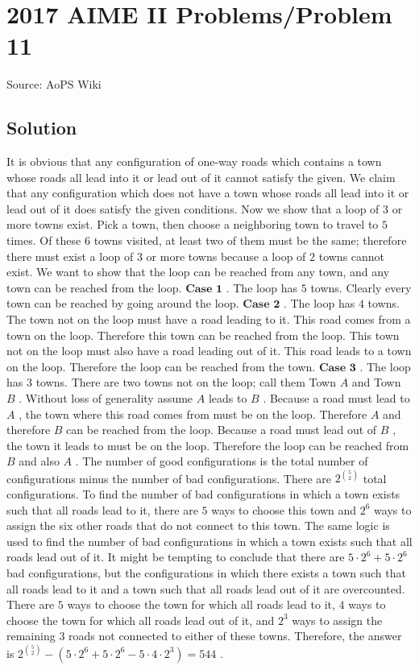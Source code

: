 \documentclass[12pt]{article}
\begin{document}
\section*{{2017 AIME II Problems/Problem 11}}
Source: AoPS Wiki

\subsection*{Solution}
It is obvious that any configuration of one-way roads which contains a town whose roads all lead into it or lead out of it cannot satisfy the given. We claim that any configuration which does not have a town whose roads all lead into it or lead out of it does satisfy the given conditions. Now we show that a loop of $3$ or more towns exist. Pick a town, then choose a neighboring town to travel to $5$ times. Of these $6$ towns visited, at least two of them must be the same; therefore there must exist a loop of $3$ or more towns because a loop of $2$ towns cannot exist. We want to show that the loop can be reached from any town, and any town can be reached from the loop. $\textbf{Case 1}$ . The loop has $5$ towns.
Clearly every town can be reached by going around the loop. $\textbf{Case 2}$ . The loop has $4$ towns.
The town not on the loop must have a road leading to it. This road comes from a town on the loop. Therefore this town can be reached from the loop. This town not on the loop must also have a road leading out of it. This road leads to a town on the loop. Therefore the loop can be reached from the town. $\textbf{Case 3}$ . The loop has $3$ towns.
There are two towns not on the loop; call them Town $A$ and Town $B$ . Without loss of generality assume $A$ leads to $B$ . Because a road must lead to $A$ , the town where this road comes from must be on the loop. Therefore $A$ and therefore $B$ can be reached from the loop. Because a road must lead out of $B$ , the town it leads to must be on the loop. Therefore the loop can be reached from $B$ and also $A$ . The number of good configurations is the total number of configurations minus the number of bad configurations. There are $2^{{5\choose2}}$ total configurations. To find the number of bad configurations in which a town exists such that all roads lead to it, there are $5$ ways to choose this town and $2^6$ ways to assign the six other roads that do not connect to this town. The same logic is used to find the number of bad configurations in which a town exists such that all roads lead out of it. It might be tempting to conclude that there are $5 \cdot 2^6+5 \cdot 2^6$ bad configurations, but the configurations in which there exists a town such that all roads lead to it and a town such that all roads lead out of it are overcounted. There are $5$ ways to choose the town for which all roads lead to it, $4$ ways to choose the town for which all roads lead out of it, and $2^3$ ways to assign the remaining $3$ roads not connected to either of these towns. Therefore, the answer is $2^{{5\choose2}}-(5 \cdot 2^6+5 \cdot 2^6-5\cdot 4 \cdot 2^3)=\boxed{544}$ .
\end{document}
